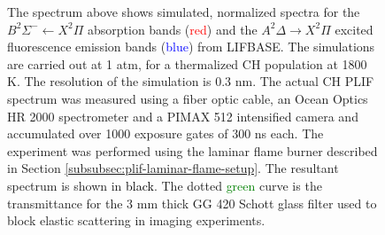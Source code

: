 \begin{figure}

\centering



\caption[CH PLIF Spectrum]{The spectrum above shows simulated, normalized spectra for the \(B^2\Sigma^-\leftarrow X^2\Pi\) absorption bands (\textcolor{red}{red}) and the \(A^2\Delta\rightarrow X^2\Pi\) excited fluorescence emission bands (\textcolor{blue}{blue}) from LIFBASE. The simulations are carried out at 1 atm, for a thermalized CH population at 1800 K. The resolution of the simulation is 0.3 nm. The actual CH PLIF spectrum was measured using a fiber optic cable, an Ocean Optics HR 2000 spectrometer and a PIMAX 512 intensified camera and accumulated over 1000 exposure gates of 300 ns each. The experiment was performed using the laminar flame burner described in Section \ref{subsubsec:plif-laminar-flame-setup}. The resultant spectrum is shown in \textcolor{black}{black}. The dotted \textcolor{green}{green} curve is the transmittance for the 3 mm thick GG 420 Schott glass filter used to block elastic scattering in imaging experiments.}

\label{fig:chPLIFSpectrum}

\end{figure}

